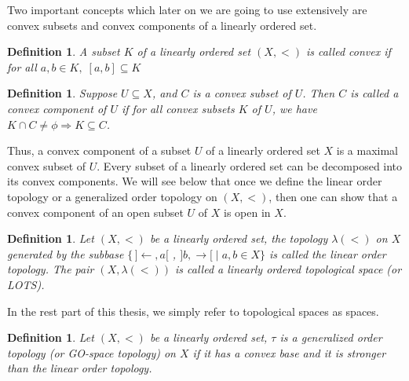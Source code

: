 \documentclass[12pt,oneside,english]{amsbook}
\numberwithin{equation}{section} %
\numberwithin{figure}{section} %
\theoremstyle{plain}
\numberwithin{section}{chapter}
\theoremstyle{plain}
\newtheorem{defn}[thm]{Definition}
\begin{document}
Two important concepts which later on we are going to use extensively are convex subsets and convex components of a linearly ordered set.

\begin{defn}
  A subset $K$ of a linearly ordered set $(X, <)$ is called convex if for all $a, b \in K, \; [a,b] \subseteq K$
\end{defn}

\begin{defn}
Suppose $U \subseteq X$, and $C$ is a convex subset of $U$. Then $C$ is called a convex component of $U$ if for all convex subsets $K$ of $U$,
we have $K \cap C \neq \phi \Rightarrow K \subseteq C$.
\end{defn}

Thus, a convex component of a subset $U$ of a linearly ordered set $X$ is a maximal convex subset of $U$. Every subset of a linearly ordered set can be decomposed into its convex components. We will see below that once we define the linear order topology or a generalized order topology on $(X,<)$, then one can show that a convex component of an open subset $U$ of $X$ is open in $X$.

\begin{defn}
  Let $(X,<)$ be a linearly ordered set, the topology $\lambda (<)$ on $X$ generated by the subbase $\{\,]\leftarrow, a[$ , $]b, \rightarrow[ \; | \; a,b \in X\}$ is called the linear order topology. The pair $(X,\lambda (<))$ is called a linearly ordered topological space (or LOTS).
\end{defn}

In the rest part of this thesis, we simply refer to topological spaces as spaces. 
\begin{defn}
  Let $(X,<)$ be a linearly ordered set, $\tau$ is a generalized order topology (or GO-space topology) on $X$ if it has a convex base and it is stronger than the linear order topology.
\end{defn}
\end{document}
